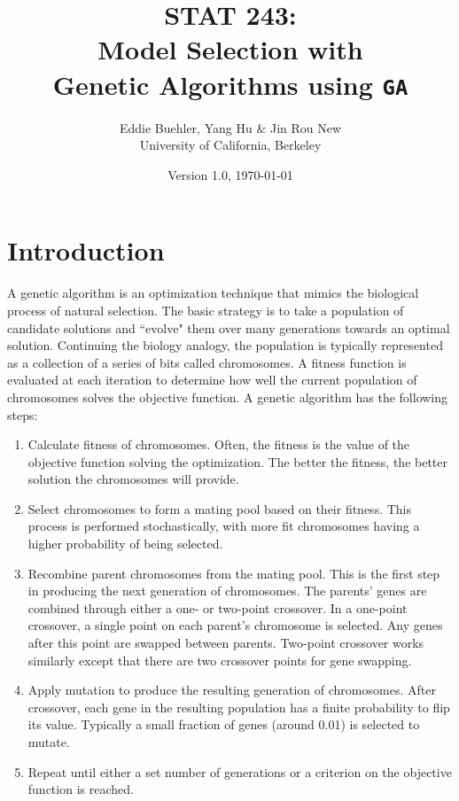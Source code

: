 \documentclass[11pt]{article}
\title{STAT 243: \\
	Model Selection with\\ 
	Genetic Algorithms using \texttt{GA}}
\author{Eddie Buehler, Yang Hu \& Jin Rou New\\
	University of California, Berkeley}
\date{Version 1.0, \today}
\begin{document}
\maketitle

\section{Introduction}
\label{sec:introduction}
A genetic algorithm is an optimization technique that mimics the
biological process of natural selection. The basic strategy is to take
a population of candidate solutions and ``evolve" them over many generations towards an
optimal solution. Continuing the biology analogy, the
population is typically represented as a collection of a series of bits called chromosomes. A fitness function is evaluated at each iteration to
determine how well the current population of chromosomes solves the objective
function. A genetic algorithm has the following steps: 
\begin{enumerate}
	\item Calculate fitness of chromosomes. Often, the
          fitness is the value of the objective function solving the
          optimization. The better the fitness, the better solution
          the chromosomes will provide.
	\item Select chromosomes to form a mating pool based on their
          fitness. This process is performed stochastically, with more
          fit chromosomes having a higher probability of being
          selected. 
	\item Recombine parent chromosomes from the mating pool. This
          is the first step in producing the next generation of
          chromosomes. The parents' genes are combined through either a
          one- or two-point crossover. In a one-point crossover, a
          single point on each parent's chromosome is selected. Any genes
          after this point are swapped between parents. Two-point
          crossover works similarly except that there are two
          crossover points for gene swapping.
	\item Apply mutation to produce the resulting generation of
          chromosomes. After crossover, each gene in the resulting
          population has a finite probability to flip its value. Typically a
          small fraction of genes (around 0.01) is selected to
          mutate.
        \item Repeat until either a set number of generations or a
          criterion on the objective function is reached.
\end{enumerate}
\end{document}

